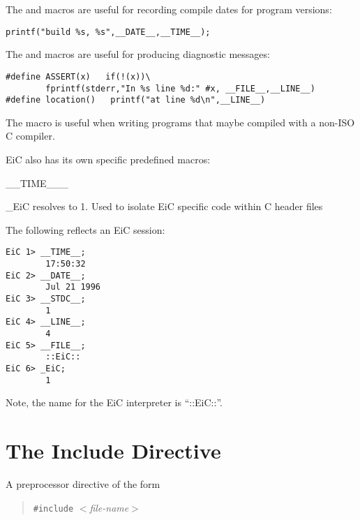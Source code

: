 The  and  macros are useful for
recording compile dates for program versions:
\begin{production}
\begin{verbatim}
printf("build %s, %s",__DATE__,__TIME__);
\end{verbatim}
\end{production}

The  and  macros are useful for
producing diagnostic messages:

\begin{production}
\begin{verbatim}
#define ASSERT(x)   if(!(x))\
        fprintf(stderr,"In %s line %d:" #x, __FILE__,__LINE__)
#define location()   printf("at line %d\n",__LINE__)
\end{verbatim}
\end{production}

The  macro is useful when writing programs that maybe
compiled with a non-ISO C compiler.



EiC also has its own specific predefined macros:

\begin{Ventry}{\_\_TIME\_\_\_} 
\item[\_EiC]   
resolves to 1.  Used to isolate EiC specific code within C header files
\end{Ventry}
\normalsize


The following reflects an EiC session:

\begin{production}
\begin{verbatim}
EiC 1> __TIME__;
        17:50:32
EiC 2> __DATE__;
        Jul 21 1996
EiC 3> __STDC__;
        1
EiC 4> __LINE__;
        4
EiC 5> __FILE__;
        ::EiC::
EiC 6> _EiC;
        1
\end{verbatim}
\end{production} 

Note, the  name for the EiC interpreter is ``::EiC::''.


\section{The Include Directive}
\label{sec:Include}

\label{item:include}   
	A preprocessor directive of the form
	\begin{quote} 
	{\tt \#include} {\it $<$file-name$>$}  	
	\end{quote}

